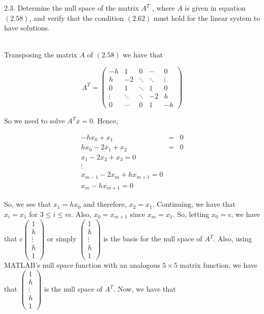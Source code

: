 2.3. Determine the null space of the matrix $A^T$ , where $A$ is given in equation $(2.58)$, and verify
that the condition $(2.62)$ must hold for the linear system to have solutions.\\

\begin{solution}\renewcommand{\qedsymbol}{}\ \\
    Transposing the matrix $A$ of $(2.58)$ we have that
    
    $$A^T=\left(\begin{array}{ccccc} -h & 1 & 0 & \cdots & 0\\ h & -2 & \ddots & \ddots & \vdots
                                  \\ 0 & 1 & \ddots & 1 & 0\\ \vdots & \ddots & \ddots & -2 & h
                                  \\ 0 & \cdots & 0 & 1 & -h \end{array}\right)$$
    
    So we need to solve $A^Tx=0$. Hence,
    
    $$\begin{array}{lcl} -hx_0+x_1 & = & 0 \\ hx_0-2x_1+x_2 & = & 0 \\ x_1-2x_2+x_3=0 \\ \vdots
                      \\ x_{m-1}-2x_{m}+hx_{m+1}=0 \\ x_{m}-hx_{m+1}=0 \end{array}$$
                      
    So, we see that $x_1=hx_0$ and therefore, $x_2=x_1$. Continuing, we have that $x_i=x_1$ for 
    $3\leq i\leq m$. Also, $x_0=x_{m+1}$ since $x_{m}=x_1$. So, letting $x_0=c$, we have that 
    $c\left(\begin{array}{c} 1\\ h\\ \vdots\\ h\\ 1 \end{array}\right)$ or simply 
    $\left(\begin{array}{c} 1\\ h\\ \vdots\\ h\\ 1 \end{array}\right)$ is the basis for the null space 
    of $A^T$. Also, using MATLAB's null space function with an analogous $5\times 5$ matrix function,
    we have that $\left(\begin{array}{c} 1\\ h\\ \vdots\\ h\\ 1 \end{array}\right)$ is the null space of
    $A^T$. Now, we have that
    

\end{solution}
